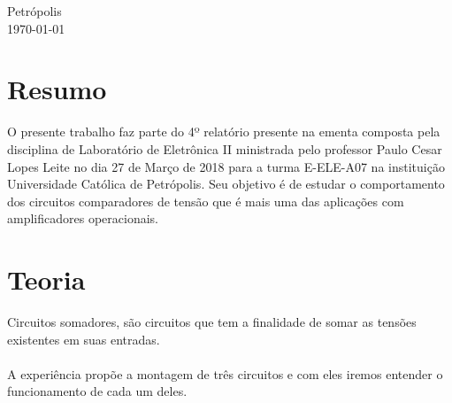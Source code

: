 \documentclass[11pt]{article}
\begin{document}
\begin{titlepage}
	
	
	\vfill\vfill\vfill %
	Petrópolis\\
	{\large\today} %
	
	
	 
	
	\vfill %
	
\end{titlepage}
\newpage

\tableofcontents
\newpage

\section{Resumo}
O presente trabalho faz parte do 4º relatório presente na ementa composta pela disciplina de Laboratório de Eletrônica II ministrada pelo professor  Paulo Cesar Lopes Leite no dia 27 de Março de 2018 
para a turma E-ELE-A07 na instituição 
Universidade Católica de Petrópolis. Seu objetivo é de estudar o comportamento dos circuitos comparadores de tensão que é mais uma das aplicações com amplificadores operacionais.
\section{Teoria}
Circuitos somadores, são circuitos que tem a finalidade de somar as tensões existentes em suas entradas.\\\\

A experiência propõe a montagem de três circuitos e com eles iremos entender o funcionamento de cada um deles.
\end{document}
